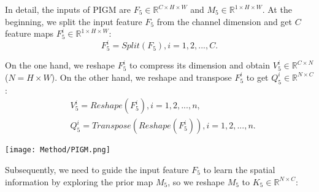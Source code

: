 \documentclass[lettersize,journal]{IEEEtran}
\begin{document}
\par
In detail, the inputs of PIGM are $F_{5} \in  {\mathbb{R}}^ {C\times H\times W}$ and $M_{5} \in  {\mathbb{R}}^ {1\times H\times W}$. At the beginning, we split the input feature $F_{5}$ from the channel dimension and get $C$ feature maps $F_{5}^{i} \in {\mathbb{R}}^ {1\times H\times W} $:
\begin{equation}
\label{equ1} 
    F_{5}^{i} = Split(F_{5}), i=1,2,...,C.
\end{equation}

\par
On the one hand, we reshape $F_{5}^{i}$ to compress its dimension and obtain $V_{5}^{i} \in  {\mathbb{R}}^ {C\times N}$ ($N = H \times W$). On the other hand, we reshape and transpose $F_{5}^{i}$ to get $Q_{5}^{i} \in  {\mathbb{R}}^ {N\times C}$:
\begin{equation}
\label{equ2} 
\begin{split}
    &V_{5}^{i} = Reshape(F_{5}^{i}), i=1,2,...,n,\\
    &Q_{5}^{i} = Transpose(Reshape(F_{5}^{i})), i=1,2,...,n.
\end{split}
\end{equation}

\begin{figure*}[t]
\centering
\texttt{[image: Method/PIGM.png]}
\caption{}
\vspace{-1.0em}
\label{fig_4}
\end{figure*}

\par
Subsequently, we need to guide the input feature $F_{5}$ to learn the spatial information by exploring the prior map $M_{5}$, so we reshape $M_{5}$ to $K_{5} \in  {\mathbb{R}}^ {N\times C}$:
\end{document}

